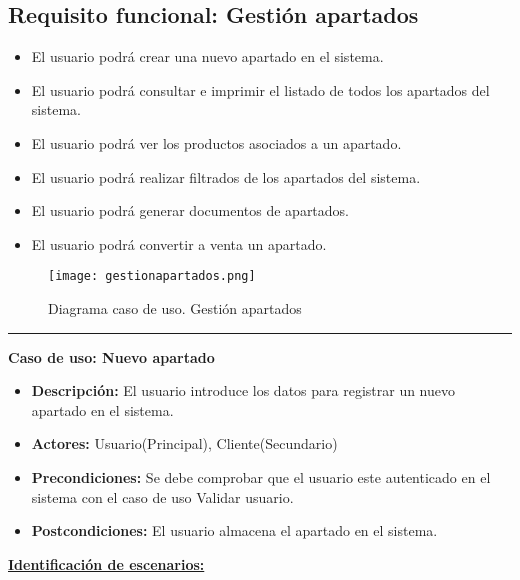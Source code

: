 \subsection{Requisito funcional: Gestión apartados}

\begin{itemize}
 \item El usuario podrá crear una nuevo apartado en el sistema.
 \item El usuario podrá consultar e imprimir el listado de todos los apartados del sistema.
 \item El usuario podrá ver los productos asociados a un apartado.
 \item El usuario podrá realizar filtrados de los apartados del sistema.
 \item El usuario podrá generar documentos de apartados.
\item El usuario podrá convertir a venta un apartado.

\end{itemize}
\begin{figure}[H]
  \centering
    \texttt{[image: gestionapartados.png]}
  \caption{Diagrama caso de uso. Gestión apartados}
  \label{cu7}
\end{figure}
\smallskip
\hrule height 1pt
\smallskip
\textbf{Caso de uso: Nuevo apartado}
\begin{itemize}\renewcommand{\labelitemi}{$\cdot$}
  \item \textbf{Descripción:} El usuario introduce los datos para registrar un nuevo apartado en el sistema.
  \item \textbf{Actores:} Usuario(Principal), Cliente(Secundario)
  \item \textbf{Precondiciones:} Se debe comprobar que el usuario este autenticado en el sistema con el caso de uso Validar usuario.
  \item \textbf{Postcondiciones:} El usuario almacena el apartado en el sistema.
\end{itemize}
\underline{\textbf{Identificación de escenarios:}}
